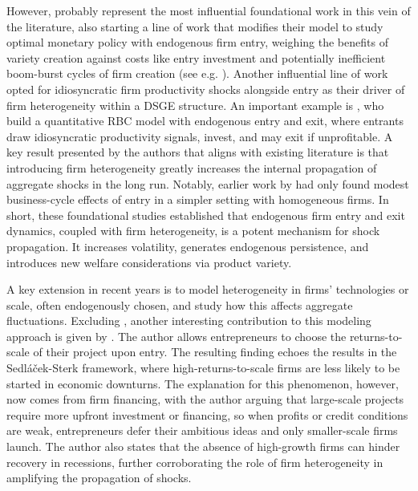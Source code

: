 \documentclass[a4paper,12pt]{article} %
\numberwithin{equation}{section} %
\numberwithin{figure}{section}
\numberwithin{table}{section}
\begin{document}
However, \textcite{bilbiie2012endogenous} probably represent the most influential foundational work in this vein of the literature, 
also starting a line of work that modifies their model to study optimal monetary policy with endogenous firm entry, weighing the benefits 
of variety creation against costs like entry investment and potentially inefficient boom-burst cycles of firm creation (see e.g. \cite{bilbiie2014optimal, lewis2012firm}).
Another influential line of work opted for idiosyncratic firm productivity shocks alongside entry as their driver of firm heterogeneity within a DSGE structure. 
An important example is \textcite{clementi2016entry}, who build a quantitative RBC model with endogenous entry and exit, where entrants draw idiosyncratic 
productivity signals, invest, and may exit if unprofitable. A key result presented by the authors that aligns with existing literature is that introducing 
firm heterogeneity greatly increases the internal propagation of aggregate shocks in the long run. Notably, earlier work by \textcite{samaniego2008entry} had 
only found modest business-cycle effects of entry in a simpler setting with homogeneous firms. In short, these foundational studies established that 
endogenous firm entry and exit dynamics, coupled with firm heterogeneity, is a potent mechanism for shock propagation. It increases volatility, 
generates endogenous persistence, and introduces new welfare considerations via product variety.

A key extension in recent years is to model heterogeneity in firms' technologies or scale, often endogenously chosen, and study how this 
affects aggregate fluctuations. Excluding \textcite{sedlavcek2017growth}, another interesting contribution to this modeling approach is given 
by \textcite{smirnyagin2023returns}. The author allows entrepreneurs to choose the returns-to-scale of their project upon entry. The resulting 
finding echoes the results in the Sedláček-Sterk framework, where high-returns-to-scale firms are less likely to be started in economic downturns.
The explanation for this phenomenon, however, now comes from firm financing, with the author arguing that large-scale projects require more 
upfront investment or financing, so when profits or credit conditions are weak, entrepreneurs defer their ambitious ideas and only smaller-scale 
firms launch. The author also states that the absence of high-growth firms can hinder recovery in recessions, further corroborating the role of 
firm heterogeneity in amplifying the propagation of shocks.
\end{document}

